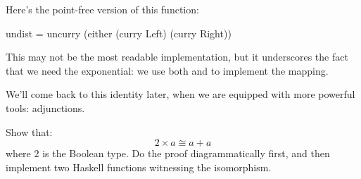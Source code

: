 \documentclass[DaoFP]{subfiles}
\begin{document}
Here's the point-free version of this function:
\begin{haskell}
undist = uncurry (either (curry Left) (curry Right))
\end{haskell}
This may not be the most readable implementation, but it underscores the fact that we need the exponential: we use both  and  to implement the mapping.

We'll come back to this identity later, when we are equipped with more powerful tools: adjunctions.

\begin{exercise}
Show that:
\[ 2 \times a \cong a + a \]
where $2$ is the Boolean type. Do the proof diagrammatically first, and then implement two Haskell functions witnessing the isomorphism.
\end{exercise}
\end{document}

